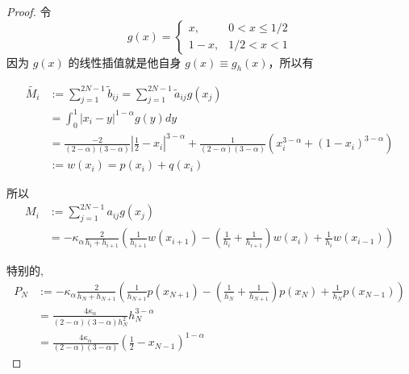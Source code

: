 \documentclass{ctexart}
\theoremstyle{definition}
\theoremstyle{remark}
\numberwithin{equation}{section}
\begin{document}
\begin{proof}
    令
    \begin{equation}
        g(x) = \begin{cases}
            x, & 0<x\le 1/2 \\ 1-x , & 1/2<x<1
        \end{cases}
    \end{equation}
    因为 \(g(x)\) 的线性插值就是他自身 \(g(x)\equiv g_h(x)\)，所以有

    \begin{equation}
        \begin{aligned}
            \tilde{M_i} & := \sum_{j=1}^{2N-1} \tilde{b}_{ij}
            = \sum_{j=1}^{2N-1} \tilde{a}_{ij} g(x_j)                                                                                                         \\
                        & = \int_{0}^1 |x_i-y|^{1-\alpha} g(y) dy                                                                                             \\
                        & = \frac{-2}{(2-\alpha)(3-\alpha)}|\frac{1}{2}-x_i|^{3-\alpha} + \frac{1}{(2-\alpha)(3-\alpha)}(x_i^{3-\alpha} + (1-x_i)^{3-\alpha}) \\
                        & := w(x_i) = p(x_i) + q(x_i)
        \end{aligned}
    \end{equation}

    所以
    \begin{equation}
        \begin{aligned}
            M_i & := \sum_{j=1}^{2N-1} a_{ij} g(x_j) \\
                & = -\kappa_\alpha\frac{2}{h_i + h_{i+1}}
            \left( \frac{1}{h_{i+1}} w(x_{i+1})
            - (\frac{1}{h_{i}}+\frac{1}{h_{i+1}}) w(x_{i})
            +  \frac{1}{h_{i}} w(x_{i-1}) \right)
        \end{aligned}
    \end{equation}


    特别的,
    \begin{equation}
        \begin{aligned}
            P_N & := -\kappa_\alpha \frac{2}{h_N + h_{N+1}}
            \left( \frac{1}{h_{N+1}} p(x_{N+1})
            - (\frac{1}{h_{N}}+\frac{1}{h_{N+1}}) p(x_{N})
            +  \frac{1}{h_{N}} p(x_{N-1}) \right)                                        \\
                & = \frac{4 \kappa_\alpha}{(2-\alpha)(3-\alpha) h_N^2} h_N^{3-\alpha}             \\
                & = \frac{4 \kappa_\alpha}{(2-\alpha)(3-\alpha)} (\frac{1}{2}-x_{N-1})^{1-\alpha}
        \end{aligned}
    \end{equation}


\end{proof}
\end{document}
